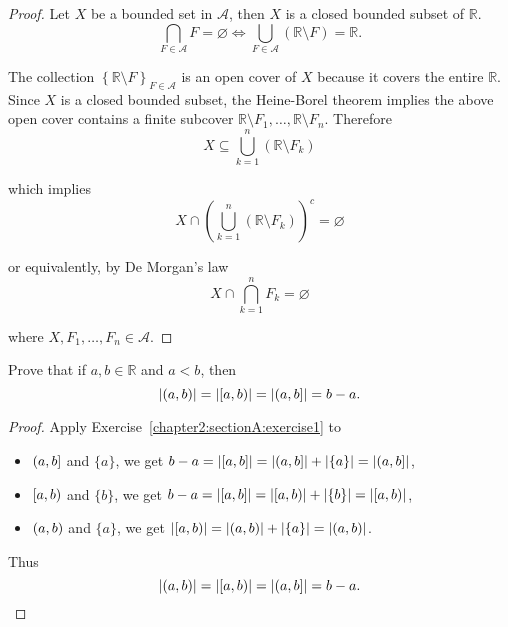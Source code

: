 \begin{proof}
    Let $X$ be a bounded set in $\mathcal{A}$, then $X$ is a closed bounded subset of $\mathbb{R}$.
    \[
        \bigcap_{F\in\mathcal{A}}F = \varnothing \Longleftrightarrow \bigcup_{F\in\mathcal{A}} (\mathbb{R}\setminus F) = \mathbb{R}.
    \]

    The collection ${\left\{ \mathbb{R}\setminus F \right\}}_{F\in\mathcal{A}}$ is an open cover of $X$ because it covers the entire $\mathbb{R}$. Since $X$ is a closed bounded subset, the Heine-Borel theorem implies the above open cover contains a finite subcover $\mathbb{R}\setminus F_{1}, \ldots, \mathbb{R}\setminus F_{n}$. Therefore
    \[
        X\subseteq \bigcup^{n}_{k=1}(\mathbb{R}\setminus F_{k})
    \]

    which implies
    \[
        X\cap {\left(\bigcup^{n}_{k=1}(\mathbb{R}\setminus F_{k})\right)}^{c} = \varnothing
    \]

    or equivalently, by De Morgan's law
    \[
        X\cap \bigcap^{n}_{k=1}F_{k} = \varnothing
    \]

    where $X, F_{1}, \ldots, F_{n}\in\mathcal{A}$.
\end{proof}
\newpage

\begin{exercise}\label{chapter2:sectionA:exercise6}
    Prove that if $a, b\in\mathbb{R}$ and $a < b$, then
    \[
        \left\vert{\left({a, b}\right)}\right\vert = \left\vert{\left[{a, b}\right)}\right\vert = \left\vert{\left({a, b}\right]}\right\vert = b - a.
    \]
\end{exercise}

\begin{proof}
    Apply Exercise~\ref{chapter2:sectionA:exercise1} to
    \begin{itemize}
        \item $\left({a, b}\right]$ and $\{ a \}$, we get $b - a = \left\vert{\left[{a, b}\right]}\right\vert = \left\vert{\left({a, b}\right]}\right\vert + \left\vert{\{a\}}\right\vert = \left\vert{\left({a, b}\right]}\right\vert$,
        \item $\left[{a, b}\right)$ and $\{ b \}$, we get $b - a = \left\vert{\left[{a, b}\right]}\right\vert = \left\vert{\left[{a, b}\right)}\right\vert + \left\vert{\{b\}}\right\vert = \left\vert{\left[{a, b}\right)}\right\vert$,
        \item $\left({a, b}\right)$ and $\{ a \}$, we get $\left\vert{\left[{a, b}\right)}\right\vert = \left\vert{\left({a, b}\right)}\right\vert + \left\vert{\{ a \}}\right\vert = \left\vert{\left({a, b}\right)}\right\vert$.
    \end{itemize}

    Thus
    \[
        \left\vert{\left({a, b}\right)}\right\vert = \left\vert{\left[{a, b}\right)}\right\vert = \left\vert{\left({a, b}\right]}\right\vert = b - a.
    \]
\end{proof}
\newpage

